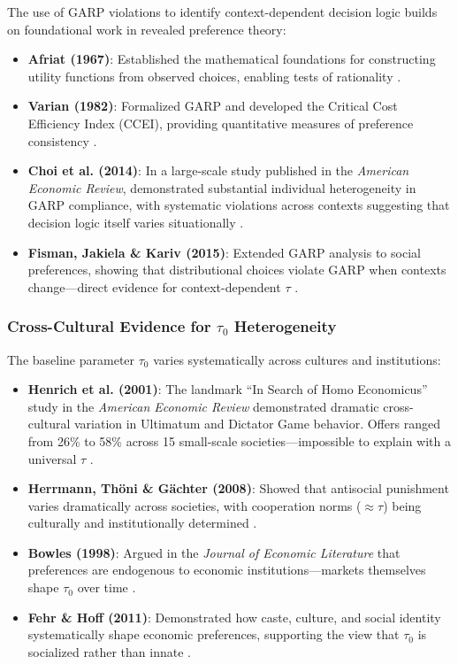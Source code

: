 The use of GARP violations to identify context-dependent decision logic builds on foundational work in revealed preference theory:

\begin{itemize}
\item \textbf{Afriat (1967)}: Established the mathematical foundations for constructing utility functions from observed choices, enabling tests of rationality \cite{afriat1967}.

\item \textbf{Varian (1982)}: Formalized GARP and developed the Critical Cost Efficiency Index (CCEI), providing quantitative measures of preference consistency \cite{varian1982}.

\item \textbf{Choi et al. (2014)}: In a large-scale study published in the \textit{American Economic Review}, demonstrated substantial individual heterogeneity in GARP compliance, with systematic violations across contexts suggesting that decision logic itself varies situationally \cite{choi2014}.

\item \textbf{Fisman, Jakiela \& Kariv (2015)}: Extended GARP analysis to social preferences, showing that distributional choices violate GARP when contexts change---direct evidence for context-dependent $\tau$ \cite{fisman2015}.
\end{itemize}

\subsubsection{Cross-Cultural Evidence for $\tau_0$ Heterogeneity}

The baseline parameter $\tau_0$ varies systematically across cultures and institutions:

\begin{itemize}
\item \textbf{Henrich et al. (2001)}: The landmark ``In Search of Homo Economicus'' study in the \textit{American Economic Review} demonstrated dramatic cross-cultural variation in Ultimatum and Dictator Game behavior. Offers ranged from 26\% to 58\% across 15 small-scale societies---impossible to explain with a universal $\tau$ \cite{henrich2001}.

\item \textbf{Herrmann, Thöni \& Gächter (2008)}: Showed that antisocial punishment varies dramatically across societies, with cooperation norms ($\approx \tau$) being culturally and institutionally determined \cite{herrmann2008}.

\item \textbf{Bowles (1998)}: Argued in the \textit{Journal of Economic Literature} that preferences are endogenous to economic institutions---markets themselves shape $\tau_0$ over time \cite{bowles1998}.

\item \textbf{Fehr \& Hoff (2011)}: Demonstrated how caste, culture, and social identity systematically shape economic preferences, supporting the view that $\tau_0$ is socialized rather than innate \cite{fehrhoff2011}.
\end{itemize}

